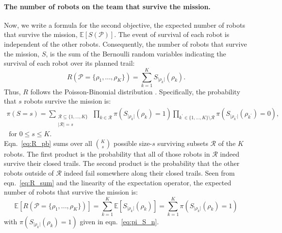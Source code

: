 \documentclass[11pt, oneside]{article}
\begin{document}
\paragraph{The number of robots on the team that survive the mission.} 
Now, we write a formula for the second objective, the expected number of robots that survive the mission, $\mathbb{E}[S(\mathcal{P})]$.
The event of survival of each robot is independent of the other robots.
Consequently, the number of robots that survive the mission, $S$, is the sum of the Bernoulli random variables indicating the survival of each robot over its planned trail:
\begin{equation}
	R(\mathcal{P}=\{\rho_1, ..., \rho_K\})=\sum_{k=1}^K S_{\lvert \rho_k \rvert}(\rho_k). \label{eq:R_sum}
\end{equation}
Thus, $R$ follows the Poisson-Binomial distribution \cite{tang2023poisson}.
Specifically, the probability that $s$ robots survive the mission is:
\begin{multline}
	\pi(S=s) = \sum_{\substack{\mathcal{R} \subseteq \{1, ..., K\}  \\ \lvert \mathcal{R} \rvert = s} } \,
	\prod_{k \in \mathcal{R}} \pi(S_{\lvert \rho_k \rvert}(\rho_k) = 1)
	\prod_{k^\prime \in \{1, ..., K\} \setminus \mathcal{R}}
	 \pi(S_{\lvert \rho_{k^\prime} \rvert}(\rho_{k^\prime}) = 0)
	 , \\ \text{ for } 0 \leq s \leq K.
	\label{eq:R_pb}
\end{multline}
Eqn.~\ref{eq:R_pb} sums over all $\binom{K}{s}$ possible size-$s$ surviving subsets $\mathcal{R}$ of the $K$ robots. The first product is the probability that all of those robots in $\mathcal{R}$ indeed survive their closed trails. The second product is the probability that the other robots outside of $\mathcal{R}$ indeed fail somewhere along their closed trails.
Seen from eqn.~\ref{eq:R_sum} and the linearity of the expectation operator, the expected number of robots that survive the mission is:
\begin{equation}
	\mathbb{E}[R(\mathcal{P}=\{\rho_1, ..., \rho_K\})]=\sum_{k=1}^K \mathbb{E}[S_{\lvert \rho_k \rvert}(\rho_k)] = \sum_{k=1}^K  \pi(S_{\lvert \rho_k \rvert}(\rho_k) = 1) \label{eq:formula_obj2}
\end{equation} with $\pi(S_{\lvert \rho_k \rvert}(\rho_k) = 1)$ given in eqn.~\ref{eq:pi_S_n}.
\end{document}

